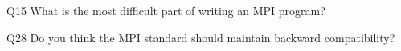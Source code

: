 \begin{description}%
\item{Q15} What is the most difficult part of writing an MPI program?%
\item{Q28} Do you think the MPI standard should maintain backward compatibility?%
\end{description}%
